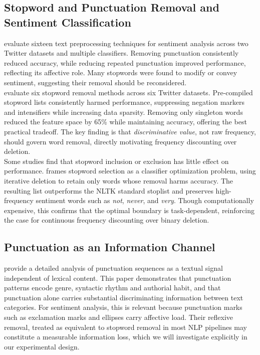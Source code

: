 \documentclass[a4paper,10pt]{article}
\begin{document}
\subsection{Stopword and Punctuation Removal and Sentiment Classification}
\citet{symeonidis2018preprocessing} evaluate sixteen text preprocessing techniques for sentiment analysis across two Twitter datasets and multiple classifiers. Removing punctuation consistently reduced accuracy, while reducing repeated punctuation improved performance, reflecting its affective role. Many stopwords were found to modify or convey sentiment, suggesting their removal should be reconsidered.\\
\citet{saif2014stopwords} evaluate six stopword removal methods across six Twitter datasets. Pre-compiled stopword lists consistently harmed performance, suppressing negation markers and intensifiers while increasing data sparsity. Removing only singleton words reduced the feature space by 65\% while maintaining accuracy, offering the best practical tradeoff. The key finding is that \emph{discriminative value}, not raw frequency, should govern word removal, directly motivating frequency discounting over deletion.\\
Some studies find that stopword inclusion or exclusion has little effect on performance. \citet{dipietro2022stopwords} frames stopword selection as a classifier optimization problem, using iterative deletion to retain only words whose removal harms accuracy. The resulting list outperforms the NLTK standard stoplist and preserves high-frequency sentiment words such as \emph{not}, \emph{never}, and \emph{very}. Though computationally expensive, this confirms that the optimal boundary is task-dependent, reinforcing the case for continuous frequency discounting over binary deletion.

\subsection{Punctuation as an Information Channel}
\citet{darmon2018pull} provide a detailed analysis of punctuation sequences as a textual signal independent of lexical content. This paper demonstrates that punctuation patterns encode genre, syntactic rhythm and authorial habit, and that punctuation alone carries substantial discriminating information between text categories. For sentiment analysis, this is relevant because punctuation marks such as exclamation marks and ellipses carry affective load. Their reflexive removal, treated as equivalent to stopword removal in most NLP pipelines may constitute a measurable information loss, which we will investigate explicitly in our experimental design.
\end{document}
